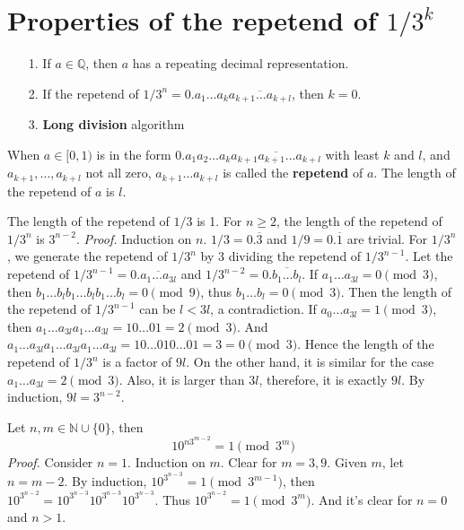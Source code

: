 \documentclass[paper=a4]{scrartcl}
\begin{document}
\section{Properties of the repetend of $1/3^k$}
\begin{tcolorbox}[arc=0pt,colback=white,title={Fact}]
\begin{itemize}
\item[1.] If $a\in\mathbb{Q}$, then $a$ has a repeating decimal representation.
\item[2.] If the repetend of $1/3^n=0.a_1\ldots a_{k}\overline{a_{k+1}\ldots a_{k+l}}$, then $k=0$.
\item[3.] \textbf{Long division} algorithm
\end{itemize}
\end{tcolorbox}
\begin{tcolorbox}[arc=0pt,colback=white,title={Definition}]
When $a\in[0,1)$ is in the form $0.a_1a_2\ldots a_{k}\overline{a_{k+1}a_{k+1}\ldots a_{k+l}}$ with least $k$ and $l$, and $a_{k+1},\ldots,a_{k+l}$ not all zero, $a_{k+1}\ldots a_{k+l}$ is called the \textbf{repetend} of $a$. The length of the repetend of $a$ is $l$.
\end{tcolorbox}
\begin{tcolorbox}[arc=0pt,colback=white,title={Property}]
The length of the repetend of $1/3$ is 1. For $n\geq 2$, the length of the repetend of $1/3^n$ is $3^{n-2}$.
\tcblower
\textit{Proof. } Induction on $n$. $1/3=0.\overline 3$ and $1/9=0.\overline 1$ are trivial. For $1/3^n$, we generate the repetend of $1/3^n$ by  3 dividing the repetend of $1/3^{n-1}$.  Let the repetend of $1/3^{n-1}=0.\overline{a_1\ldots a_{3l}}$ and $1/3^{n-2}=0.\overline{b_1\ldots b_l}$. If $a_1\ldots a_{3l}=0\pmod{3}$, then $b_1\ldots b_lb_1\ldots b_lb_1\ldots b_l=0\pmod{9}$, thus $b_1\ldots b_l=0\pmod 3$. Then the length of the repetend of $1/3^{n-1}$ can be $l<3l$, a contradiction. If $a_0\ldots a_{3l}=1\pmod 3$, then $a_1\ldots a_{3l}a_1\ldots a_{3l}=10\ldots 01=2\pmod 3$. And $a_1\ldots a_{3l}a_1\ldots a_{3l}a_1\ldots a_{3l}=10\ldots 010\ldots 01=3=0\pmod 3$. Hence the length of the repetend of $1/3^n$ is a factor of $9l$. On the other hand, it is similar for the case $a_1\ldots a_{3l}=2\pmod 3$. Also, it is larger than $3l$, therefore, it is exactly $9l$. By induction, $9l=3^{n-2}$.
\end{tcolorbox}

\begin{tcolorbox}[arc=0pt,colback=white,title={Property}]
Let $n,m\in\mathbb{N}\cup\{0\}$, then 
\[
10^{n3^{m-2}}=1\pmod{3^m}
\]
\tcblower
\textit{Proof.} Consider $n=1$. Induction on $m$. Clear for $m=3,9$. Given $m$, let $n=m-2$. By induction, $10^{3^{n-3}}=1\pmod{3^{m-1}}$, then $10^{3^{n-2}}=10^{3^{n-3}}10^{3^{n-3}}10^{3^{n-3}}$. Thus $10^{3^{n-2}}=1\pmod{3^m}$. And it's clear for $n=0$ and $n>1$.
\end{tcolorbox}
\end{document}
